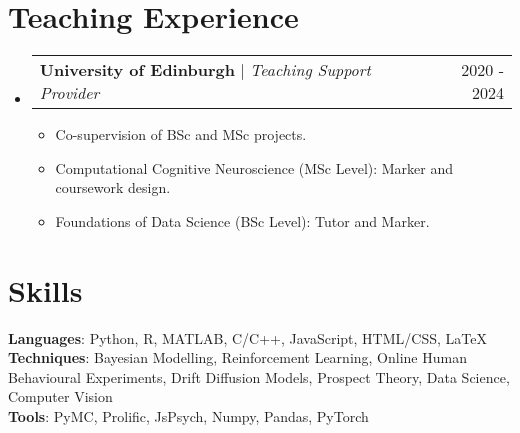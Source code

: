 \documentclass[letterpaper,11pt]{article}
\makeatletter
\newcommand{\resumeItem}[1]{
    \item\small{
    {\vspace{-2pt} #1}
  }
}
\newcommand{\resumeProjectHeading}[2]{
    \item
    \begin{tabular*}{0.97\textwidth}{l@{\extracolsep{\fill}}r}
      \small#1 & #2 \\
    \end{tabular*}\vspace{0pt}
}
\newcommand{\resumeSubHeadingListStart}{\begin{itemize}[leftmargin=0.15in, label={}]}
\newcommand{\resumeSubHeadingListEnd}{\end{itemize}}
\newcommand{\resumeItemListStart}{\begin{itemize}[label={\tiny\raisebox{0.5ex}{\textbullet}}]}
\newcommand{\resumeItemListEnd}{\end{itemize}\vspace{-5pt}}
\makeatother
\begin{document}

\section{Teaching Experience}
\resumeSubHeadingListStart
  \resumeProjectHeading
  {\textbf{University of Edinburgh} $|$ \footnotesize\emph{Teaching Support Provider}\vspace{-10pt}}{2020 - 2024}
  \resumeItemListStart
    \resumeItem{Co-supervision of BSc and MSc projects.}
    \resumeItem{Computational Cognitive Neuroscience (MSc Level): Marker and coursework design.}
    \resumeItem{Foundations of Data Science (BSc Level): Tutor and Marker.}
  \resumeItemListEnd
\resumeSubHeadingListEnd






\section{Skills}
\begin{itemize}[leftmargin=0.15in, label={}]
    \small{\item{

          \textbf{Languages}{: Python, R, MATLAB, C/C++, JavaScript, HTML/CSS, \LaTeX} \\
          \textbf{Techniques}{: Bayesian Modelling, Reinforcement Learning, Online Human Behavioural Experiments, Drift Diffusion Models, Prospect Theory, Data Science, Computer Vision}\\
          \textbf{Tools}{: PyMC, Prolific, JsPsych, Numpy, Pandas, PyTorch}
          }}
\end{itemize}
\end{document}
